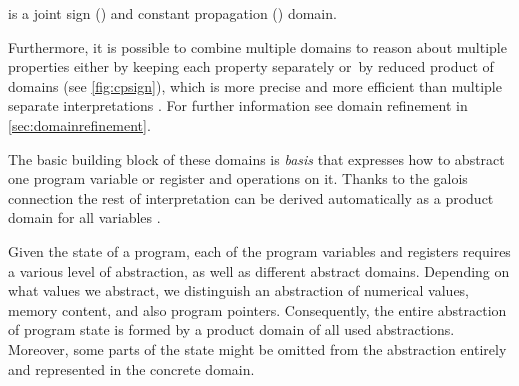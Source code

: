 \begin{marginfigure}%
    \centering
{}
    \caption{ is a joint sign () and constant propagation () domain.}
    \label{fig:cpsign}%
\end{marginfigure}%

Furthermore, it is possible to combine multiple domains to
reason about multiple properties either by keeping each property separately
or~by reduced product of domains (see \autoref{fig:cpsign}), which is more
precise and more efficient than multiple separate interpretations
\cite{Cousot2011b}.  For further information see domain refinement in
\autoref{sec:domainrefinement}.

The basic building block of these domains is \emph{basis} that expresses how to
abstract one program variable or register and operations on it.  Thanks to the
galois connection the rest of interpretation can be derived automatically as a
product domain for all variables \cite{Mine2004Thesis}.

Given the state of a program, each of the program variables and registers
requires a various level of abstraction, as well as different abstract domains.
Depending on what values we abstract, we distinguish an abstraction of numerical
values, memory content, and also program pointers. Consequently, the entire
abstraction of program state is formed by a product domain of all used
abstractions. Moreover, some parts of the state might be omitted from the
abstraction entirely and represented in the concrete domain.

